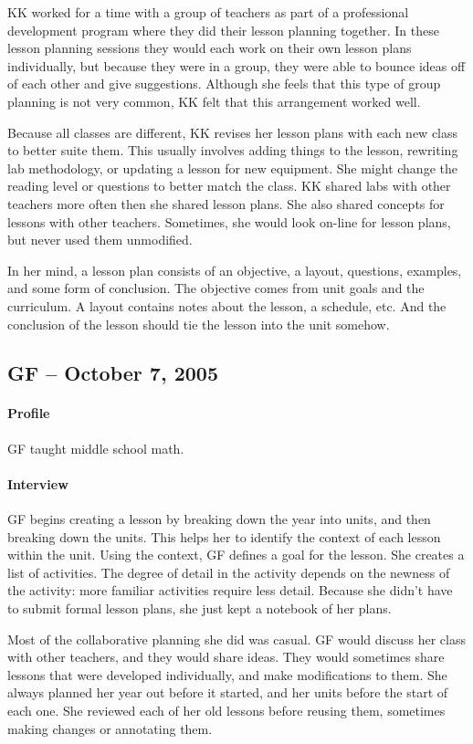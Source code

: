 \documentclass[12pt,titlepage]{article}
\begin{document}
KK worked for a time with a group of teachers as part of a professional
development program where they did their lesson planning together. In these
lesson planning sessions they would each work on their own lesson plans
individually, but because they were in a group, they were able to bounce ideas
off of each other and give suggestions. Although she feels that this type of
group planning is not very common, KK felt that this arrangement worked
well.

Because all classes are different, KK revises her lesson plans with each new
class to better suite them. This usually involves adding things to the lesson,
rewriting lab methodology, or updating a lesson for new equipment. She might
change the reading level or questions to better match the class. KK shared labs
with other teachers more often then she shared lesson plans. She also shared
concepts for lessons with other teachers. Sometimes, she would look on-line for
lesson plans, but never used them unmodified.

In her mind, a lesson plan consists of an objective, a layout, questions,
examples, and some form of conclusion. The objective comes from unit goals and
the curriculum. A layout contains notes about the lesson, a schedule, etc. And
the conclusion of the lesson should tie the lesson into the unit somehow.

\subsection{GF -- October 7, 2005}
\paragraph{Profile} GF taught middle school math.

\paragraph{Interview}GF begins creating a lesson by breaking down the year into
units, and then breaking down the units. This helps her to identify the context
of each lesson within the unit. Using the context, GF defines a goal for the
lesson. She creates a list of activities. The degree of detail in the activity
depends on the newness of the activity: more familiar activities require less
detail.  Because she didn't have to submit formal lesson plans, she just kept a
notebook of her plans.

Most of the collaborative planning she did was casual. GF would discuss her
class with other teachers, and they would share ideas. They would sometimes
share lessons that were developed individually, and make modifications to them.
She always planned her year out before it started, and her units before the
start of each one. She reviewed each of her old lessons before reusing them,
sometimes making changes or annotating them.
\end{document}
